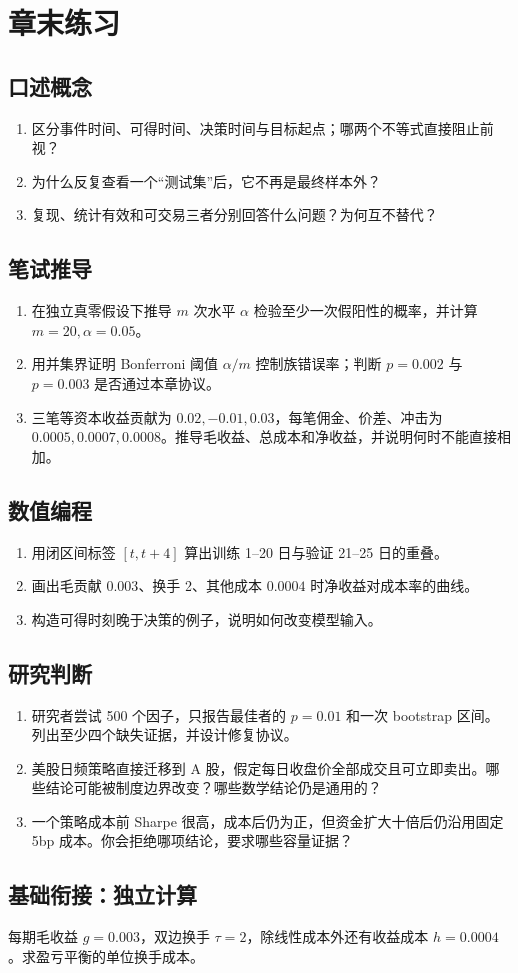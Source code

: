 \section*{章末练习}
\begingroup\small
\subsection*{口述概念}
\begin{enumerate}[nosep,leftmargin=*]
  \item 区分事件时间、可得时间、决策时间与目标起点；哪两个不等式直接阻止前视？
  \item 为什么反复查看一个“测试集”后，它不再是最终样本外？
  \item 复现、统计有效和可交易三者分别回答什么问题？为何互不替代？
\end{enumerate}

\subsection*{笔试推导}
\begin{enumerate}[nosep,leftmargin=*]
  \item 在独立真零假设下推导 $m$ 次水平 $\alpha$ 检验至少一次假阳性的概率，并计算 $m=20,\alpha=0.05$。
  \item 用并集界证明 Bonferroni 阈值 $\alpha/m$ 控制族错误率；判断 $p=0.002$ 与 $p=0.003$ 是否通过本章协议。
  \item 三笔等资本收益贡献为 $0.02,-0.01,0.03$，每笔佣金、价差、冲击为 $0.0005,0.0007,0.0008$。推导毛收益、总成本和净收益，并说明何时不能直接相加。
\end{enumerate}

\subsection*{数值编程}
\begin{enumerate}[leftmargin=*]
  \item 用闭区间标签 $[t,t+4]$ 算出训练 1--20 日与验证 21--25 日的重叠。
  \item 画出毛贡献 $0.003$、换手 2、其他成本 $0.0004$ 时净收益对成本率的曲线。
  \item 构造可得时刻晚于决策的例子，说明如何改变模型输入。
\end{enumerate}

\subsection*{研究判断}
\begin{enumerate}[nosep,leftmargin=*]
  \item 研究者尝试 500 个因子，只报告最佳者的 $p=0.01$ 和一次 bootstrap 区间。列出至少四个缺失证据，并设计修复协议。
  \item 美股日频策略直接迁移到 A 股，假定每日收盘价全部成交且可立即卖出。哪些结论可能被制度边界改变？哪些数学结论仍是通用的？
  \item 一个策略成本前 Sharpe 很高，成本后仍为正，但资金扩大十倍后仍沿用固定 5bp 成本。你会拒绝哪项结论，要求哪些容量证据？
\end{enumerate}
\endgroup

\subsection*{基础衔接：独立计算}
每期毛收益 $g=0.003$，双边换手 $\tau=2$，除线性成本外还有收益成本 $h=0.0004$。求盈亏平衡的单位换手成本。
